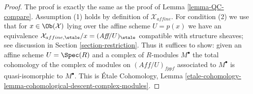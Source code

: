 \begin{proof}
The proof is exactly the same as the proof of Lemma \ref{lemma-QC-compare}.
Assumption (1) holds by definition of $\mathcal{X}_{affine}$.
For condition (2) we use that for $x \in \Ob(\mathcal{X})$
lying over the affine scheme $U = p(x)$ we have an equivalence
$\mathcal{X}_{affine, \etale}/x = (\textit{Aff}/U)_\etale$ compatible
with structure sheaves; see
discussion in Section \ref{section-restriction}.
Thus it suffices to show: given an affine scheme $U = \Spec(R)$
and a complex of $R$-modules $M^\bullet$ the total cohomology
of the complex of modules on $(\textit{Aff}/U)_{fppf}$
associated to $M^\bullet$ is quasi-isomorphic to $M^\bullet$.
This is \'Etale Cohomology, Lemma
\ref{etale-cohomology-lemma-cohomological-descent-complex-modules}.
\end{proof}
















